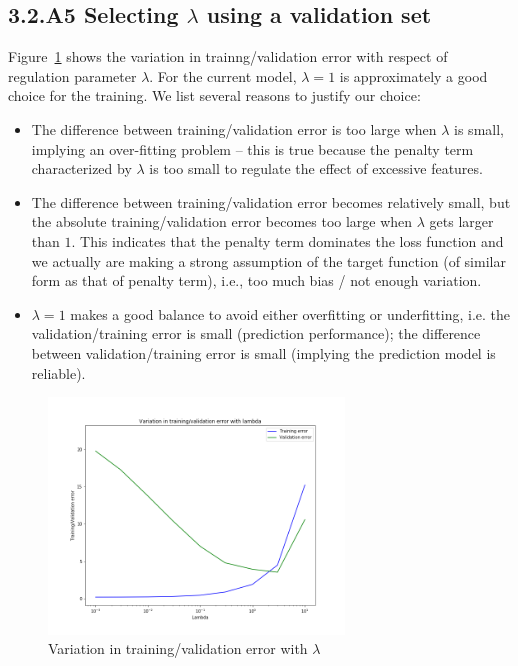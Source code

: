 \documentclass[english,11pt]{article}
\begin{document}
\subsection*{3.2.A5 Selecting $\lambda$ using a validation set}
Figure~\ref{fig:3_2_A5} shows the variation in trainng/validation error with respect of regulation parameter $\lambda$.  For the current model, $\lambda=1$ is approximately a good choice for the training. We list several reasons to justify our choice:
\begin{itemize}
	\item The difference between training/validation error is too large when $\lambda$ is small, implying an over-fitting problem -- this is true because the penalty term characterized by $\lambda$ is too small to regulate the effect of excessive features.
	\item The difference between training/validation error becomes relatively small, but the absolute training/validation error becomes too large when $\lambda$ gets larger than $1$. This indicates that the penalty term dominates the loss function and we actually are making a strong assumption of the target function (of similar form as that of penalty term), i.e., too much bias / not enough variation. 
	\item $\lambda=1$ makes a good balance to avoid either overfitting or underfitting, i.e. the validation/training error is small (prediction performance); the difference between validation/training error is small (implying the prediction model is reliable).
\end{itemize}
\begin{figure}[h]
\centering
\includegraphics[width=0.7\textwidth]{../hw1/part2/fig3_2_A5.png}
\caption{Variation in training/validation error with $\lambda$}
\label{fig:3_2_A5}
\end{figure}
\end{document}
